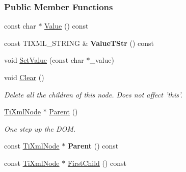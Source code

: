 \subsubsection*{Public Member Functions}
\begin{DoxyCompactItemize}
\item 
const char $\ast$ \hyperlink{class_ti_xml_node_a77943eb90d12c2892b1337a9f5918b41}{Value} () const 
\item 
\hypertarget{class_ti_xml_node_a83ece13d2ea66dac66e0b21332229239}{
const TIXML\_\-STRING \& {\bfseries ValueTStr} () const }
\label{class_ti_xml_node_a83ece13d2ea66dac66e0b21332229239}

\item 
void \hyperlink{class_ti_xml_node_a2a38329ca5d3f28f98ce932b8299ae90}{SetValue} (const char $\ast$\_\-value)
\item 
\hypertarget{class_ti_xml_node_a708e7f953df61d4d2d12f73171550a4b}{
void \hyperlink{class_ti_xml_node_a708e7f953df61d4d2d12f73171550a4b}{Clear} ()}
\label{class_ti_xml_node_a708e7f953df61d4d2d12f73171550a4b}

\begin{DoxyCompactList}\small\item\em Delete all the children of this node. Does not affect 'this'. \item\end{DoxyCompactList}\item 
\hypertarget{class_ti_xml_node_ab643043132ffd794f8602685d34a982e}{
\hyperlink{class_ti_xml_node}{TiXmlNode} $\ast$ \hyperlink{class_ti_xml_node_ab643043132ffd794f8602685d34a982e}{Parent} ()}
\label{class_ti_xml_node_ab643043132ffd794f8602685d34a982e}

\begin{DoxyCompactList}\small\item\em One step up the DOM. \item\end{DoxyCompactList}\item 
\hypertarget{class_ti_xml_node_a78878709e53066f06eb4fcbcdd3a5260}{
const \hyperlink{class_ti_xml_node}{TiXmlNode} $\ast$ {\bfseries Parent} () const }
\label{class_ti_xml_node_a78878709e53066f06eb4fcbcdd3a5260}

\item 
\hypertarget{class_ti_xml_node_a44c8eee26bbe2d1b2762038df9dde2f0}{
const \hyperlink{class_ti_xml_node}{TiXmlNode} $\ast$ \hyperlink{class_ti_xml_node_a44c8eee26bbe2d1b2762038df9dde2f0}{FirstChild} () const }
\label{class_ti_xml_node_a44c8eee26bbe2d1b2762038df9dde2f0}


\end{DoxyCompactItemize}
